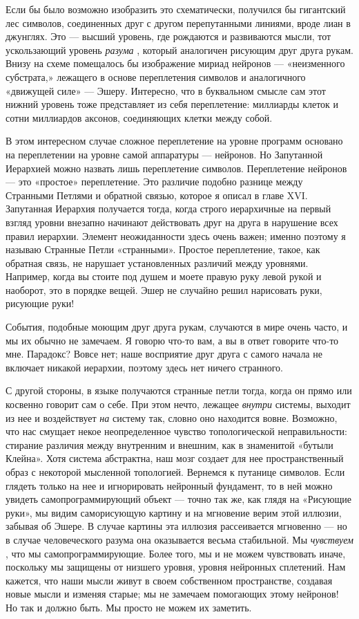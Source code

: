 \documentclass[../main.tex]{subfiles}
\begin{document}
Если бы было возможно изобразить это схематически, получился бы гигантский лес символов, соединенных друг с другом перепутанными линиями, вроде лиан в джунглях. Это --- высший уровень, где рождаются и развиваются мысли, тот ускользающий уровень \emph{разума} , который аналогичен рисующим друг друга рукам. Внизу на схеме помещалось бы изображение мириад нейронов --- «неизменного субстрата,» лежащего в основе переплетения символов и аналогичного «движущей силе» --- Эшеру. Интересно, что в буквальном смысле сам этот нижний уровень тоже представляет из себя переплетение: миллиарды клеток и сотни миллиардов аксонов, соединяющих клетки между собой.

В этом интересном случае сложное переплетение на уровне программ основано на переплетении на уровне самой аппаратуры --- нейронов. Но Запутанной Иерархией можно назвать лишь переплетение символов. Переплетение нейронов --- это «простое» переплетение. Это различие подобно разнице между Странными Петлями и обратной связью, которое я описал в главе XVI. Запутанная Иерархия получается тогда, когда строго иерархичные на первый взгляд уровни внезапно начинают действовать друг на друга в нарушение всех правил иерархии. Элемент неожиданности здесь очень важен; именно поэтому я называю Странные Петли «странными». Простое переплетение, такое, как обратная связь, не нарушает установленных различий между уровнями. Например, когда вы стоите под душем и моете правую руку левой рукой и наоборот, это в порядке вещей. Эшер не случайно решил нарисовать руки, рисующие руки!

События, подобные моющим друг друга рукам, случаются в мире очень часто, и мы их обычно не замечаем. Я говорю что-то вам, а вы в ответ говорите что-то мне. Парадокс? Вовсе нет; наше восприятие друг друга с самого начала не включает никакой иерархии, поэтому здесь нет ничего странного.

С другой стороны, в языке получаются странные петли тогда, когда он прямо или косвенно говорит сам о себе. При этом нечто, лежащее \emph{внутри} системы, выходит из нее и воздействует \emph{на} систему так, словно оно находится вовне. Возможно, что нас смущает некое неопределенное чувство топологической неправильности: стирание различия между внутренним и внешним, как в знаменитой «бутыли Клейна». Хотя система абстрактна, наш мозг создает для нее пространственный образ с некоторой мысленной топологией. Вернемся к путанице символов. Если глядеть только на нее и игнорировать нейронный фундамент, то в ней можно увидеть самопрограммирующий объект --- точно так же, как глядя на «Рисующие руки», мы видим саморисующую картину и на мгновение верим этой иллюзии, забывая об Эшере. В случае картины эта иллюзия рассеивается мгновенно --- но в случае человеческого разума она оказывается весьма стабильной. Мы \emph{чувствуем} , что мы самопрограммирующие. Более того, мы и не можем чувствовать иначе, поскольку мы защищены от низшего уровня, уровня нейронных сплетений. Нам кажется, что наши мысли живут в своем собственном пространстве, создавая новые мысли и изменяя старые; мы не замечаем помогающих этому нейронов! Но так и должно быть. Мы просто не можем их заметить.
\end{document}
